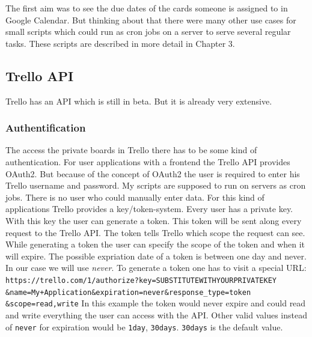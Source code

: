 The first aim was to see the due dates of the cards someone is assigned to in Google Calendar. But thinking about that there were many other use cases for small scripts which could run as cron jobs on a server to serve several regular tasks. These scripts are described in more detail in Chapter 3.

\subsection{Trello API}
Trello has an API  which is still in beta. But it is already very extensive. \cite{trello:docu}

\subsubsection{Authentification}
The access the private boards in Trello there has to be some kind of authentication. For user applications with a frontend the Trello API provides OAuth2. But because of the concept of OAuth2 the user is required to enter his Trello username and password. \cite{oauth} My scripts are supposed to run on servers as cron jobs. There is no user who could manually enter data. For this kind of applications Trello provides a key/token-system. Every user has a private key. With this key the user can generate a token. This token will be sent along every request to the Trello API. The token tells Trello which scope the request can see. While generating a token the user can specify the scope of the token and when it will expire. The possible expriation date of a token is between one day and never. In our case we will use \emph{never}. To generate a token one has to visit a special URL:
\texttt{
https://trello.com/1/authorize?key=SUBSTITUTEWITHYOURPRIVATEKEY \&name=My+Application\&expiration=never\&response\_type=token \&scope=read,write}
In this example the token would never expire and could read and write everything the user can access with the API. Other valid values instead of \texttt{never} for expiration would be \texttt{1day}, \texttt{30days}. \texttt{30days} is the default value. \cite{trello:gettingstarted}

